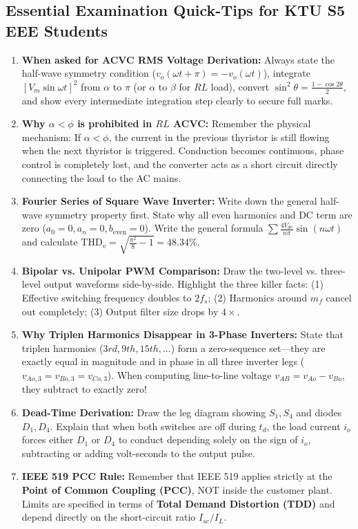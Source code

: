 \documentclass[11pt,a4paper]{article}
\begin{document}
\subsection{Essential Examination Quick-Tips for KTU S5 EEE Students}
\begin{enumerate}[leftmargin=*]
  \item \textbf{When asked for ACVC RMS Voltage Derivation:} Always state the half-wave symmetry condition ($v_o(\omega t + \pi) = -v_o(\omega t)$), integrate $[V_m \sin\omega t]^2$ from $\alpha$ to $\pi$ (or $\alpha$ to $\beta$ for $RL$ load), convert $\sin^2\theta = \frac{1 - \cos 2\theta}{2}$, and show every intermediate integration step clearly to secure full marks.
  \item \textbf{Why $\alpha < \phi$ is prohibited in $RL$ ACVC:} Remember the physical mechanism: If $\alpha < \phi$, the current in the previous thyristor is still flowing when the next thyristor is triggered. Conduction becomes continuous, phase control is completely lost, and the converter acts as a short circuit directly connecting the load to the AC mains.
  \item \textbf{Fourier Series of Square Wave Inverter:} Write down the general half-wave symmetry property first. State why all even harmonics and DC term are zero ($a_0 = 0, a_n = 0, b_{\text{even}} = 0$). Write the general formula $\sum \frac{4V_{dc}}{n\pi}\sin(n\omega t)$ and calculate $\text{THD}_v = \sqrt{\frac{\pi^2}{8}-1} = 48.34\%$.
  \item \textbf{Bipolar vs. Unipolar PWM Comparison:} Draw the two-level vs. three-level output waveforms side-by-side. Highlight the three killer facts: (1) Effective switching frequency doubles to $2f_s$; (2) Harmonics around $m_f$ cancel out completely; (3) Output filter size drops by $4\times$.
  \item \textbf{Why Triplen Harmonics Disappear in 3-Phase Inverters:} State that triplen harmonics ($3rd, 9th, 15th, \dots$) form a zero-sequence set—they are exactly equal in magnitude and in phase in all three inverter legs ($v_{Ao,3} = v_{Bo,3} = v_{Co,3}$). When computing line-to-line voltage $v_{AB} = v_{Ao} - v_{Bo}$, they subtract to exactly zero!
  \item \textbf{Dead-Time Derivation:} Draw the leg diagram showing $S_1, S_4$ and diodes $D_1, D_4$. Explain that when both switches are off during $t_d$, the load current $i_o$ forces either $D_1$ or $D_4$ to conduct depending solely on the sign of $i_o$, subtracting or adding volt-seconds to the output pulse.
  \item \textbf{IEEE 519 PCC Rule:} Remember that IEEE 519 applies strictly at the \textbf{Point of Common Coupling (PCC)}, NOT inside the customer plant. Limits are specified in terms of \textbf{Total Demand Distortion (TDD)} and depend directly on the short-circuit ratio $I_{sc} / I_L$.
\end{enumerate}
\end{document}
